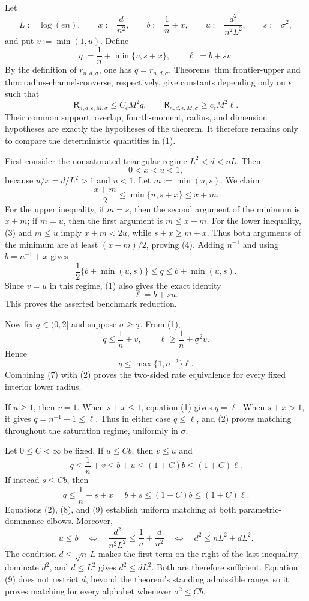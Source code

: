 Let
\[
 L:=\log(en),\qquad x:=\frac d{n^2},\qquad
 b:=\frac1n+x,\qquad u:=\frac{d^2}{n^2L^2},
 \qquad s:=\sigma^2,
\]
and put \(v:=\min(1,u)\).  Define
\[
 q:=\frac1n+\min\{v,s+x\},
 \qquad
 \ell:=b+sv.
\tag{1}
\]
By the definition of \(r_{n,d,\sigma}\), one has \(q=r_{n,d,\sigma}\).  Theorems~\(\mathrm{thm:frontier\text{-}upper}\) and \(\mathrm{thm:radius\text{-}channel\text{-}converse}\), respectively, give constants depending only on \(\epsilon\) such that
\[
 \mathsf R_{n,d,\epsilon,M,\sigma}\le C_{\epsilon}M^2q,
 \qquad
 \mathsf R_{n,d,\epsilon,M,\sigma}\ge c_{\epsilon}M^2\ell.
\tag{2}
\]
Their common support, overlap, fourth-moment, radius, and dimension hypotheses are exactly the hypotheses of the theorem.  It therefore remains only to compare the deterministic quantities in (1).

First consider the nonsaturated triangular regime \(L^2<d<nL\).  Then
\[
 0<x<u<1,
\tag{3}
\]
because \(u/x=d/L^2>1\) and \(u<1\).  Let \(m:=\min(u,s)\).  We claim
\[
 \frac{x+m}{2}\le\min\{u,s+x\}\le x+m.
\tag{4}
\]
For the upper inequality, if \(m=s\), then the second argument of the minimum is \(x+m\); if \(m=u\), then the first argument is \(m\le x+m\).  For the lower inequality, (3) and \(m\le u\) imply \(x+m<2u\), while \(s+x\ge m+x\).  Thus both arguments of the minimum are at least \((x+m)/2\), proving (4).  Adding \(n^{-1}\) and using \(b=n^{-1}+x\) gives
\[
 \frac12\{b+\min(u,s)\}\le q\le b+\min(u,s).
\tag{5}
\]
Since \(v=u\) in this regime, (1) also gives the exact identity
\[
 \ell=b+su.
\tag{6}
\]
This proves the asserted benchmark reduction.

Now fix \(\underline\sigma\in(0,2]\) and suppose \(\sigma\ge\underline\sigma\).  From (1),
\[
 q\le\frac1n+v,
 \qquad
 \ell\ge\frac1n+\underline\sigma^2v.
\]
Hence
\[
 q\le\max\{1,\underline\sigma^{-2}\}\ell.
\tag{7}
\]
Combining (7) with (2) proves the two-sided rate equivalence for every fixed interior lower radius.

If \(u\ge1\), then \(v=1\).  When \(s+x\le1\), equation (1) gives \(q=\ell\).  When \(s+x>1\), it gives \(q=n^{-1}+1\le\ell\).  Thus in either case \(q\le\ell\), and (2) proves matching throughout the saturation regime, uniformly in \(\sigma\).

Let \(0\le C<\infty\) be fixed.  If \(u\le Cb\), then \(v\le u\) and
\[
 q\le\frac1n+v\le b+u\le(1+C)b\le(1+C)\ell.
\tag{8}
\]
If instead \(s\le Cb\), then
\[
 q\le\frac1n+s+x=b+s\le(1+C)b\le(1+C)\ell.
\tag{9}
\]
Equations (2), (8), and (9) establish uniform matching at both parametric-dominance elbows.  Moreover,
\[
 u\le b
 \quad\Longleftrightarrow\quad
 \frac{d^2}{n^2L^2}\le\frac1n+\frac d{n^2}
 \quad\Longleftrightarrow\quad
 d^2\le nL^2+dL^2.
\tag{10}
\]
The condition \(d\le\sqrt n\,L\) makes the first term on the right of the last inequality dominate \(d^2\), and \(d\le L^2\) gives \(d^2\le dL^2\).  Both are therefore sufficient.  Equation (9) does not restrict \(d\), beyond the theorem's standing admissible range, so it proves matching for every alphabet whenever \(\sigma^2\le Cb\).

